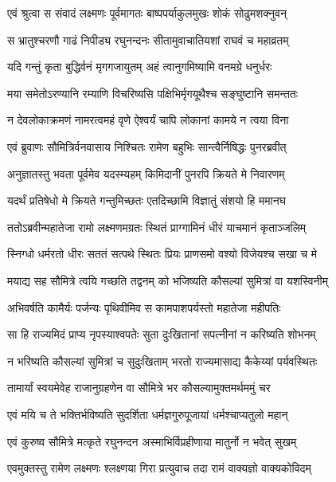 
\twolineshloka
{एवं श्रुत्वा स संवादं लक्ष्मणः पूर्वमागतः}
{बाष्पपर्याकुलमुखः शोकं सोढुमशक्नुवन्} %

\twolineshloka
{स भ्रातुश्चरणौ गाढं निपीड्य रघुनन्दनः}
{सीतामुवाचातियशां राघवं च महाव्रतम्} %

\twolineshloka
{यदि गन्तुं कृता बुद्धिर्वनं मृगगजायुतम्}
{अहं त्वानुगमिष्यामि वनमग्रे धनुर्धरः} %

\twolineshloka
{मया समेतोऽरण्यानि रम्याणि विचरिष्यसि}
{पक्षिभिर्मृगयूथैश्च सङ्घुष्टानि समन्ततः} %

\twolineshloka
{न देवलोकाक्रमणं नामरत्वमहं वृणे}
{ऐश्वर्यं चापि लोकानां कामये न त्वया विना} %

\twolineshloka
{एवं ब्रुवाणः सौमित्रिर्वनवासाय निश्चितः}
{रामेण बहुभिः सान्त्वैर्निषिद्धः पुनरब्रवीत्} %

\twolineshloka
{अनुज्ञातस्तु भवता पूर्वमेव यदस्म्यहम्}
{किमिदानीं पुनरपि क्रियते मे निवारणम्} %

\twolineshloka
{यदर्थं प्रतिषेधो मे क्रियते गन्तुमिच्छतः}
{एतदिच्छामि विज्ञातुं संशयो हि ममानघ} %

\twolineshloka
{ततोऽब्रवीन्महातेजा रामो लक्ष्मणमग्रतः}
{स्थितं प्राग्गामिनं धीरं याचमानं कृताञ्जलिम्} %

\twolineshloka
{स्निग्धो धर्मरतो धीरः सततं सत्पथे स्थितः}
{प्रियः प्राणसमो वश्यो विजेयश्च सखा च मे} %

\twolineshloka
{मयाद्य सह सौमित्रे त्वयि गच्छति तद्वनम्}
{को भजिष्यति कौसल्यां सुमित्रां वा यशस्विनीम्} %

\twolineshloka
{अभिवर्षति कामैर्यः पर्जन्यः पृथिवीमिव}
{स कामपाशपर्यस्तो महातेजा महीपतिः} %

\twolineshloka
{सा हि राज्यमिदं प्राप्य नृपस्याश्वपतेः सुता}
{दुःखितानां सपत्नीनां न करिष्यति शोभनम्} %

\twolineshloka
{न भरिष्यति कौसल्यां सुमित्रां च सुदुःखिताम्}
{भरतो राज्यमासाद्य कैकेय्यां पर्यवस्थितः} %

\twolineshloka
{तामार्यां स्वयमेवेह राजानुग्रहणेन वा}
{सौमित्रे भर कौसल्यामुक्तमर्थममुं चर} %

\twolineshloka
{एवं मयि च ते भक्तिर्भविष्यति सुदर्शिता}
{धर्मज्ञगुरुपूजायां धर्मश्चाप्यतुलो महान्} %

\twolineshloka
{एवं कुरुष्व सौमित्रे मत्कृते रघुनन्दन}
{अस्माभिर्विप्रहीणाया मातुर्नो न भवेत् सुखम्} %

\twolineshloka
{एवमुक्तस्तु रामेण लक्ष्मणः श्लक्ष्णया गिरा}
{प्रत्युवाच तदा रामं वाक्यज्ञो वाक्यकोविदम्} %

